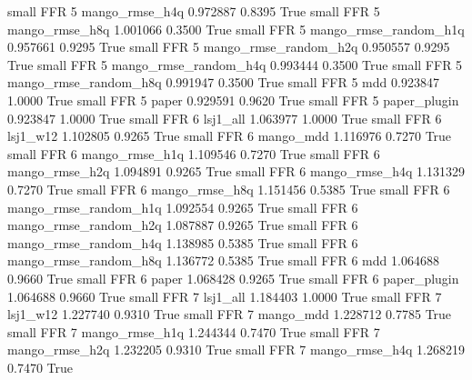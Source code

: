      small      FFR                 5        mango_rmse_h4q   0.972887      0.8395    True
     small      FFR                 5        mango_rmse_h8q   1.001066      0.3500    True
     small      FFR                 5 mango_rmse_random_h1q   0.957661      0.9295    True
     small      FFR                 5 mango_rmse_random_h2q   0.950557      0.9295    True
     small      FFR                 5 mango_rmse_random_h4q   0.993444      0.3500    True
     small      FFR                 5 mango_rmse_random_h8q   0.991947      0.3500    True
     small      FFR                 5                   mdd   0.923847      1.0000    True
     small      FFR                 5                 paper   0.929591      0.9620    True
     small      FFR                 5          paper_plugin   0.923847      1.0000    True
     small      FFR                 6              lsj1_all   1.063977      1.0000    True
     small      FFR                 6              lsj1_w12   1.102805      0.9265    True
     small      FFR                 6             mango_mdd   1.116976      0.7270    True
     small      FFR                 6        mango_rmse_h1q   1.109546      0.7270    True
     small      FFR                 6        mango_rmse_h2q   1.094891      0.9265    True
     small      FFR                 6        mango_rmse_h4q   1.131329      0.7270    True
     small      FFR                 6        mango_rmse_h8q   1.151456      0.5385    True
     small      FFR                 6 mango_rmse_random_h1q   1.092554      0.9265    True
     small      FFR                 6 mango_rmse_random_h2q   1.087887      0.9265    True
     small      FFR                 6 mango_rmse_random_h4q   1.138985      0.5385    True
     small      FFR                 6 mango_rmse_random_h8q   1.136772      0.5385    True
     small      FFR                 6                   mdd   1.064688      0.9660    True
     small      FFR                 6                 paper   1.068428      0.9265    True
     small      FFR                 6          paper_plugin   1.064688      0.9660    True
     small      FFR                 7              lsj1_all   1.184403      1.0000    True
     small      FFR                 7              lsj1_w12   1.227740      0.9310    True
     small      FFR                 7             mango_mdd   1.228712      0.7785    True
     small      FFR                 7        mango_rmse_h1q   1.244344      0.7470    True
     small      FFR                 7        mango_rmse_h2q   1.232205      0.9310    True
     small      FFR                 7        mango_rmse_h4q   1.268219      0.7470    True
